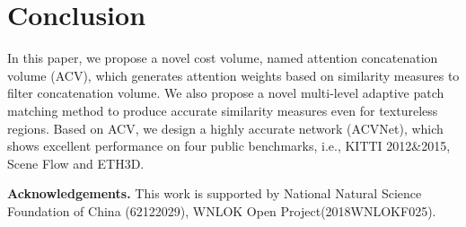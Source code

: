 \documentclass[10pt,twocolumn,letterpaper]{article}
\begin{document}
\section{Conclusion} \label{sec:conclusion}
In this paper, we propose a novel cost volume, named attention concatenation volume (ACV), which generates attention weights based on similarity measures to filter concatenation volume. We also propose a novel multi-level adaptive patch matching method to produce accurate similarity measures even for textureless regions. Based on ACV, we design a highly accurate network (ACVNet), which 
shows excellent performance
on four public benchmarks, i.e., KITTI 2012\&2015, Scene Flow and ETH3D. 


\textbf{Acknowledgements.} This work is supported by National Natural Science Foundation of China (62122029), WNLOK Open Project(2018WNLOKF025).

{\small


}
\end{document}
